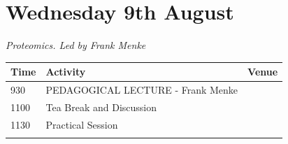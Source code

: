 \documentclass[12pt,]{book}
\begin{document}
\section*{Wednesday 9th August}\label{wednesday-9th-august}

\emph{Proteomics. Led by Frank Menke}

\begin{longtable}[]{@{}lll@{}}
\toprule
\begin{minipage}[b]{0.09\columnwidth}\raggedright\strut
Time\strut
\end{minipage} & \begin{minipage}[b]{0.35\columnwidth}\raggedright\strut
Activity\strut
\end{minipage} & \begin{minipage}[b]{0.38\columnwidth}\raggedright\strut
Venue\strut
\end{minipage}\tabularnewline
\midrule
\endhead
\begin{minipage}[t]{0.09\columnwidth}\raggedright\strut
930\strut
\end{minipage} & \begin{minipage}[t]{0.35\columnwidth}\raggedright\strut
PEDAGOGICAL LECTURE - Frank Menke\strut
\end{minipage} & \begin{minipage}[t]{0.38\columnwidth}\raggedright\strut
\strut
\end{minipage}\tabularnewline
\begin{minipage}[t]{0.09\columnwidth}\raggedright\strut
1100\strut
\end{minipage} & \begin{minipage}[t]{0.35\columnwidth}\raggedright\strut
Tea Break and Discussion\strut
\end{minipage} & \begin{minipage}[t]{0.38\columnwidth}\raggedright\strut
\strut
\end{minipage}\tabularnewline
\begin{minipage}[t]{0.09\columnwidth}\raggedright\strut
1130\strut
\end{minipage} & \begin{minipage}[t]{0.35\columnwidth}\raggedright\strut
Practical Session\strut
\end{minipage} & \begin{minipage}[t]{0.38\columnwidth}\raggedright\strut
\strut
\end{minipage}\tabularnewline
\begin{minipage}[t]{0.09\columnwidth}\raggedright\strut

\end{minipage}
\end{longtable}
\end{document}

